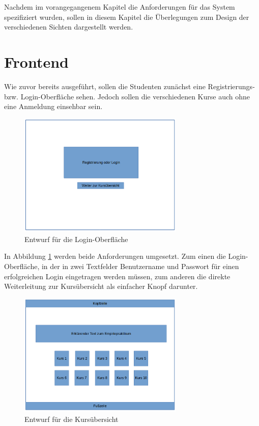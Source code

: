 Nachdem im vorangegangenem Kapitel die Anforderungen für das System spezifiziert wurden, sollen in diesem Kapitel die Überlegungen zum Design der verschiedenen Sichten dargestellt werden.

\section{Frontend}
Wie zuvor bereits ausgeführt, sollen die Studenten zunächst eine Registrierungs- bzw. Login-Oberfläche sehen.
Jedoch sollen die verschiedenen Kurse auch ohne eine Anmeldung einsehbar sein.
\begin{figure}[t]
	\centering
	\includegraphics[width=0.7\textwidth]{./design/MockUpsFrontend/login.png}
	\caption{Entwurf für die Login-Oberfläche}
	\label{mockupLoginFrontend}
\end{figure}
In Abbildung \ref{mockupLoginFrontend} werden beide Anforderungen umgesetzt.
Zum einen die Login-Oberfläche, in der in zwei Textfelder Benutzername und Passwort für einen erfolgreichen Login eingetragen werden müssen, zum anderen die direkte Weiterleitung zur Kursübersicht als einfacher Knopf darunter.
\begin{figure}[t]
	\centering
	\includegraphics[width=0.7\textwidth]{./design/MockUpsFrontend/kursuebersicht.png}
	\caption{Entwurf für die Kursübersicht}
	\label{mockupCoursesFrontend}
\end{figure}

